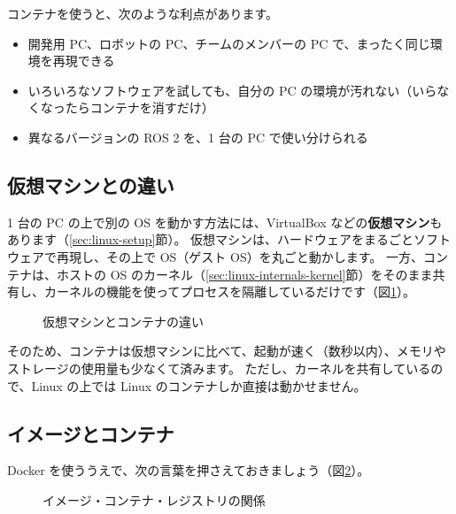 コンテナを使うと、次のような利点があります。

\begin{itemize}
  \item 開発用 PC、ロボットの PC、チームのメンバーの PC で、まったく同じ環境を再現できる
  \item いろいろなソフトウェアを試しても、自分の PC の環境が汚れない（いらなくなったらコンテナを消すだけ）
  \item 異なるバージョンの ROS 2 を、1 台の PC で使い分けられる
\end{itemize}

\subsection{仮想マシンとの違い}

1 台の PC の上で別の OS を動かす方法には、VirtualBox などの\textbf{仮想マシン}もあります（\ref{sec:linux-setup}節）。
仮想マシンは、ハードウェアをまるごとソフトウェアで再現し、その上で OS（ゲスト OS）を丸ごと動かします。
一方、コンテナは、ホストの OS のカーネル（\ref{sec:linux-internals-kernel}節）をそのまま共有し、カーネルの機能を使ってプロセスを隔離しているだけです（図\ref{fig:docker-vm}）。

\begin{figure}[tb]
  \centering
  
  \caption{仮想マシンとコンテナの違い}
  \label{fig:docker-vm}
\end{figure}

そのため、コンテナは仮想マシンに比べて、起動が速く（数秒以内）、メモリやストレージの使用量も少なくて済みます。
ただし、カーネルを共有しているので、Linux の上では Linux のコンテナしか直接は動かせません。

\subsection{イメージとコンテナ}

Docker を使ううえで、次の言葉を押さえておきましょう（図\ref{fig:docker-image}）。

\begin{figure}[tb]
  \centering
  
  \caption{イメージ・コンテナ・レジストリの関係}
  \label{fig:docker-image}
\end{figure}

